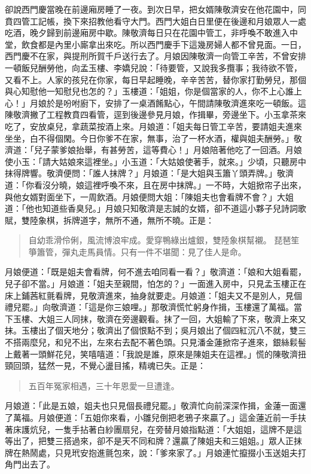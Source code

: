 卻說西門慶當晚在前邊廂房睡了一夜。到次日早，把女婿陳敬濟安在他花園中，同賁四管工記帳，換下來招教他看守大門。西門大姐白日里便在後邊和月娘眾人一處吃酒，晚夕歸到前邊廂房中歇。陳敬濟每日只在花園中管工，非呼喚不敢進入中堂，飲食都是內里小廝拿出來吃。所以西門慶手下這幾房婦人都不曾見面。一日，西門慶不在家，與提刑所賀千戶送行去了。月娘因陳敬濟一向管工辛苦，不曾安排一頓飯兒酬勞他，向孟玉樓、李嬌兒說：「待要管，又說我多攬事；我待欲不管，又看不上。人家的孩兒在你家，每日早起睡晚，辛辛苦苦，替你家打勤勞兒，那個與心知慰他一知慰兒也怎的？」玉樓道：「姐姐，你是個當家的人，你不上心誰上心！」月娘於是吩咐廚下，安排了一桌酒餚點心，午間請陳敬濟進來吃一頓飯。這陳敬濟撇了工程教賁四看管，逕到後邊參見月娘，作揖畢，旁邊坐下。小玉拿茶來吃了，安放桌兒，拿蔬菜按酒上來。月娘道：「姐夫每日管工辛苦，要請姐夫進來坐坐，白不得個閑。今日你爹不在家，無事，治了一杯水酒，權與姐夫酬勞。」敬濟道：「兒子蒙爹娘抬舉，有甚勞苦，這等費心！」月娘陪著他吃了一回酒。月娘使小玉：「請大姑娘來這裡坐。」小玉道：「大姑娘使著手，就來。」少頃，只聽房中抹得牌響。敬濟便問：「誰人抹牌？」月娘道：「是大姐與玉簫丫頭弄牌。」敬濟道：「你看沒分曉，娘這裡呼喚不來，且在房中抹牌。」一不時，大姐掀帘子出來，與他女婿對面坐下，一周飲酒。月娘便問大姐：「陳姐夫也會看牌不會？」大姐道：「他也知道些香臭兒。」月娘只知敬濟是志誠的女婿，卻不道這小夥子兒詩詞歌賦，雙陸象棋，拆牌道字，無所不通，無所不曉。正是：
\begin{quote}
自幼乖滑伶俐，風流博浪牢成。愛穿鴨綠出爐銀，雙陸象棋幫襯。
琵琶笙箏簫管，彈丸走馬員情。只有一件不堪聞：見了佳人是命。
\end{quote}

月娘便道：「既是姐夫會看牌，何不進去咱同看一看？」敬濟道：「娘和大姐看罷，兒子卻不當。」月娘道：「姐夫至親間，怕怎的？」一面進入房中，只見孟玉樓正在床上鋪茜紅氈看牌，見敬濟進來，抽身就要走。月娘道：「姐夫又不是別人，見個禮兒罷。」向敬濟道：「這是你三娘哩。」那敬濟慌忙躬身作揖，玉樓還了萬福。當下玉樓、大姐三人同抹，敬濟在旁邊觀看。抹了一回，大姐輸了下來，敬濟上來又抹。玉樓出了個天地分；敬濟出了個恨點不到；吳月娘出了個四紅沉八不就，雙三不搭兩麼兒，和兒不出，左來右去配不著色頭。只見潘金蓮掀帘子進來，銀絲鬏髻上戴著一頭鮮花兒，笑嘻嘻道：「我說是誰，原來是陳姐夫在這裡。」慌的陳敬濟扭頸回頭，猛然一見，不覺心盪目搖，精魂已失。正是：
\begin{quote}
五百年冤家相遇，三十年恩愛一旦遭逢。
\end{quote}
月娘道：「此是五娘，姐夫也只見個長禮兒罷。」敬濟忙向前深深作揖，金蓮一面還了萬福。月娘便道：「五姐你來看，小雛兒倒把老鴉子來贏了。」這金蓮近前一手扶著床護炕兒，一隻手拈著白紗團扇兒，在旁替月娘指點道：「大姐姐，這牌不是這等出了，把雙三搭過來，卻不是天不同和牌？還贏了陳姐夫和三姐姐。」眾人正抹牌在熱鬧處，只見玳安抱進氈包來，說：「爹來家了。」月娘連忙攛掇小玉送姐夫打角門出去了。

